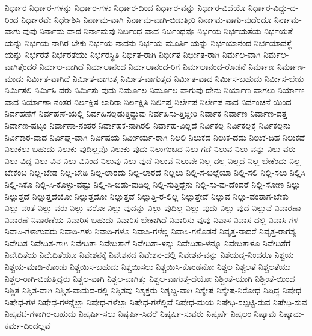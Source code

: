 {ನಿರ್ಧಾರ
ನಿರ್ಧಾರ-ಗಳನ್ನು
ನಿರ್ಧಾರ-ಗಳು
ನಿರ್ಧಾರ-ದಿಂದ
ನಿರ್ಧಾರ-ವನ್ನು
ನಿರ್ಧಾರ-ವಿದೆಯೊ
ನಿರ್ಧಾರ-ವಿದ್ದು-ದ-ರಿಂದ
ನಿರ್ಧಾರವೇ
ನಿರ್ಧೇಶಿಸಿ
ನಿರ್ನಾಮ-ವಾಗಿ
ನಿರ್ನಾಮ-ವಾಗಿ-ಬಿಡುತ್ತೀರಿ
ನಿರ್ನಾಮ-ವಾಗು-ವುದೆಂದೂ
ನಿರ್ನಾಮ-ವಾಗು-ವುವು
ನಿರ್ನಾಮ-ವಾದ
ನಿರ್ನಾಮವು
ನಿರ್ಬಂಧ-ವಾದ
ನಿರ್ಬಂಧವೂ
ನಿರ್ಭಯ
ನಿರ್ಭಯತೆಯ
ನಿರ್ಭಯತೆ-ಯನ್ನು
ನಿರ್ಭಯ-ನಾಗಿರ-ಬೇಕು
ನಿರ್ಭಯ-ನಾದನು
ನಿರ್ಭಯ-ಮೂರ್ತಿ-ಯನ್ನು
ನಿರ್ಭಯಾನಂದ
ನಿರ್ಭಯಾವಸ್ಥೆ-ಯನ್ನು
ನಿರ್ಭರತೆ
ನಿರ್ಭರತೆಯು
ನಿರ್ಭರಸ್ಥಿತಿ
ನಿರ್ಭಿತ-ರಾಗಿ
ನಿರ್ಭೀತ
ನಿರ್ಭೀತ-ರಾಗಿ
ನಿರ್ಮಲ-ವಾಗಿ
ನಿರ್ಮಲ-ವಾಗಿತ್ತೆಂದರೆ
ನಿರ್ಮಲ-ವಾಗಿದೆ
ನಿರ್ಮಲಾನಂದ
ನಿರ್ಮಲಾನಂದ-ರಿಗೆ
ನಿರ್ಮಲಾನಂದ-ರೊಡನೆ
ನಿರ್ಮಾಣ
ನಿರ್ಮಾಣ-ಮಾಡು
ನಿರ್ಮಿತ-ವಾಗಿದೆ
ನಿರ್ಮಿತ-ವಾಗುತ್ತ
ನಿರ್ಮಿತ-ವಾಗುತ್ತದೆ
ನಿರ್ಮಿತ-ವಾದ
ನಿರ್ಮಿಸ-ಬಹುದು
ನಿರ್ಮಿಸ-ಬೇಕು
ನಿರ್ಮಿಸಲಿ
ನಿರ್ಮಿಸಿ-ದರು
ನಿರ್ಮಿಸು-ವುದು
ನಿರ್ಮೂಲ
ನಿರ್ಮೂಲ-ವಾಗುವು-ದೇನು
ನಿರ್ಯಾಣ-ವಾಗಲು
ನಿರ್ಯಾಣ-ವಾದ
ನಿರ್ಯಾಣಾ-ನಂತರ
ನಿರ್ಲಕ್ಷಿಸ-ಲಾರಿರಾ
ನಿರ್ಲಕ್ಷಿಸಿ
ನಿರ್ಲಿಪ್ತ
ನಿರ್ಲೇಪ
ನಿರ್ಲೇಪ-ನಾದ
ನಿರ್ವಂಚನೆ-ಯಿಂದ
ನಿರ್ವಹಣೆಗೆ
ನಿರ್ವಹಣೆ-ಯಲ್ಲಿ
ನಿರ್ವಹಿಸಲ್ಪಡುತ್ತಿದ್ದುವು
ನಿರ್ವಹಿಸು-ತ್ತಿದ್ದೀರಿ
ನಿರ್ವಾಕ
ನಿರ್ವಾಣ
ನಿರ್ವಾಣ-ದತ್ತ
ನಿರ್ವಾಣ-ಷಟ್ಕಂ
ನಿರ್ವಾಣಾ-ನಂತರ
ನಿರ್ವಾಹಕ-ನಾಗಿರಲಿ
ನಿರ್ವಾಹ-ವಿಲ್ಲದೆ
ನಿರ್ವಿಕಲ್ಪ
ನಿರ್ವಿಕಲ್ಪಕ್ಕೆ
ನಿರ್ವಿಕಲ್ಪನು
ನಿರ್ವಿಕಾರ-ವಾದ
ನಿರ್ವಿಘ್ನ-ವಾಗಿ
ನಿರ್ವಿಷಯ
ನಿರ್ವೀರ್ಯ-ರಾಗಿ
ನಿಲಲಿ
ನಿಲುಕದ
ನಿಲುಕ-ದದು
ನಿಲುಕ-ದಿಹ
ನಿಲುಕದೆ
ನಿಲುಕಲು-ಬಹುದು
ನಿಲುಕು-ವುದಿಲ್ಲವೊ
ನಿಲುಕು-ವುದು
ನಿಲುಗಂಬದ
ನಿಲು-ಗಡೆ
ನಿಲುವ
ನಿಲು-ವನ್ನು
ನಿಲು-ವರು
ನಿಲು-ವಿದ್ದ
ನಿಲು-ವಿನ
ನಿಲು-ವಿನಿಂದ
ನಿಲುವು
ನಿಲು-ವುದೆ
ನಿಲುವೆ
ನಿಲುವೇ
ನಿಲ್ಲ-ದಲ್ಲ
ನಿಲ್ಲದೆ
ನಿಲ್ಲ-ಬೇಕೆಂದು
ನಿಲ್ಲ-ಬೇಕೆಂಬ
ನಿಲ್ಲ-ಬೇಡ
ನಿಲ್ಲ-ಬೇಡಿ
ನಿಲ್ಲ-ಲಾರದು
ನಿಲ್ಲ-ಲಾರದೆ
ನಿಲ್ಲಲು
ನಿಲ್ಲಿ-ಸ-ಬಲ್ಲೆಯಾ
ನಿಲ್ಲಿ-ಸಲಿ
ನಿಲ್ಲಿ-ಸಲು
ನಿಲ್ಲಿಸಿ
ನಿಲ್ಲಿ-ಸಿಕೊ
ನಿಲ್ಲಿ-ಸಿ-ಕೊಳ್ಳು-ವಷ್ಟು
ನಿಲ್ಲಿ-ಸಿ-ಬಿಡು-ವುದಿಲ್ಲ
ನಿಲ್ಲಿ-ಸುತ್ತಿದ್ದೆನು
ನಿಲ್ಲಿ-ಸು-ವು-ದೆಂದರೆ
ನಿಲ್ಲಿ-ಸೋಣ
ನಿಲ್ಲು
ನಿಲ್ಲುತ್ತದೆ
ನಿಲ್ಲುತ್ತದೆಯೋ
ನಿಲ್ಲುತ್ತದೋ
ನಿಲ್ಲುತ್ತವೆ
ನಿಲ್ಲುತ್ತಿ-ರ-ಲಿಲ್ಲ
ನಿಲ್ಲುತ್ತೇವೆ
ನಿಲ್ಲುವ
ನಿಲ್ಲು-ವಂತಾಗ-ಬೇಕು
ನಿಲ್ಲು-ವಂತೆ
ನಿಲ್ಲು-ವರು
ನಿಲ್ಲು-ವರೋ
ನಿಲ್ಲು-ವುದನ್ನು
ನಿಲ್ಲು-ವುದಿಲ್ಲ
ನಿಲ್ಲು-ವುದು
ನಿಲ್ಲು-ವುದೆ
ನಿಲ್ಲುವೆ
ನಿವಾರಣಾ
ನಿವಾರಣೆ
ನಿವಾರಣೆಯ
ನಿವಾರಿಸ-ಬಹುದು
ನಿವಾರಿಸ-ಬೇಕಾಗಿದೆ
ನಿವಾರಿಸು-ವುವು
ನಿವಾಸ
ನಿವಾಸ-ದಲ್ಲಿ
ನಿವಾಸಿ-ಗಳ
ನಿವಾಸಿ-ಗಳಾಗುವರು
ನಿವಾಸಿ-ಗಳು
ನಿವಾಸಿ-ಗಳೂ
ನಿವಾಸಿ-ಗಳೆಲ್ಲ
ನಿವಾಸಿ-ಗಳೊಡನೆ
ನಿವೃತ್ತ-ನಾದರೆ
ನಿವೃತ್ತ-ರಾಗಸ್ಯ
ನಿವೇದಿತ
ನಿವೇದಿತ-ಗಾಗಿ
ನಿವೇದಿತಾ
ನಿವೇದಿತಾಗೆ
ನಿವೇದಿತಾ-ಳನ್ನು
ನಿವೇದಿತಾ-ಳನ್ನೂ
ನಿವೇದಿತಾಳೂ
ನಿವೇದಿತೆಗೆ
ನಿವೇದಿತೆಯ
ನಿವೇದಿತೆಯೂ
ನಿವೇಶನಕ್ಕೆ
ನಿವೇಶನದ
ನಿವೇಶನ-ದಲ್ಲಿ
ನಿವೇಶನ-ವನ್ನು
ನಿಶೆಯಡ್ಡ-ನಿಂದರೂ
ನಿಶ್ಚಯ
ನಿಶ್ಚಯ-ಮಾಡಿ-ಕೊಂಡು
ನಿಶ್ಚಯಿಸ-ಬಹುದು
ನಿಶ್ಚಯಿಸಲು
ನಿಶ್ಚಯಿಸಿ-ಕೊಂಡೆನೋ
ನಿಶ್ಚಲ
ನಿಶ್ಚಲತೆ
ನಿಶ್ಚಲತೆಯು
ನಿಶ್ಚಲ-ರಾಗಿ-ಬಿಡುತ್ತಿದ್ದರು
ನಿಶ್ಚಲ-ವಾಗಿ
ನಿಶ್ಚಲ-ವಾಗಿತ್ತು
ನಿಶ್ಚಲ-ವಾಗುತ್ತ-ದೆಯೋ
ನಿಶ್ಚಿಂತೆ-ಯಾಗಿ
ನಿಶ್ಚಿಂತೆ-ಯಿಂದ
ನಿಶ್ಚಿತ
ನಿಶ್ಚಿತ-ವಾಗಿ
ನಿಶ್ಚಿತ-ವಾದುದ-ರಲ್ಲಿ
ನಿಶ್ಚಿತವು
ನಿಶ್ಶಕ್ತರು
ನಿಶ್ಶಬ್ದ-ವಾಗಿ
ನಿಶ್ಶೇಷ
ನಿಶ್ಶೇಷ-ನಿರೋಧ
ನಿಷಿದ್ಧ
ನಿಷೇಧ
ನಿಷೇಧ-ಗಳ
ನಿಷೇಧ-ಗಳನ್ನೆಲ್ಲಾ
ನಿಷೇಧ-ಗಳೆಲ್ಲಾ
ನಿಷೇಧ-ಗಳೆಲ್ಲಿವೆ
ನಿಷೇಧ-ಮಯ
ನಿಷೇಧಿ-ಸಲ್ಪಟ್ಟಿ-ರುವ
ನಿಷೇಧಿ-ಸುವ
ನಿಷ್ಕಪಟಿ-ಗಳಾಗಿರ-ಬಹುದು
ನಿಷ್ಕರ್ಷಿ-ಸಲು
ನಿಷ್ಕರ್ಷಿ-ಸಿದರೆ
ನಿಷ್ಕರ್ಷಿ-ಸುವರು
ನಿಷ್ಕರ್ಷೆ
ನಿಷ್ಕಲಂ
ನಿಷ್ಕಾಮ
ನಿಷ್ಕಾಮ-ಕರ್ಮ-ದಿಂದಲ್ಲವೆ
}
